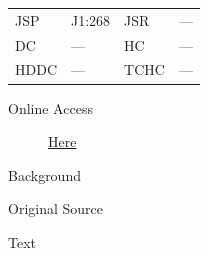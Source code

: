 					\begin{tabular}{p{0.5in}p{1in}p{0.5in}p{1in}}
					JSP	 	& J1:268		& JSR 		& --- \\
					DC	 	& ---				& HC 		& --- \\
					HDDC 	& ---				& TCHC 		& --- \\
					\end{tabular}
				
				\begin{description}
					\item[Online Access] \href{https://www.josephsmithpapers.org/paper-summary/journal-march-september-1838/26}{Here}
				\end{description}
				
				\begin{description}
					\item[Background]
				\end{description}
				
				
				\begin{description}
					\item[Original Source]
				\end{description}
				
				
				\begin{description}
					\item[Text]
				\end{description}
				
